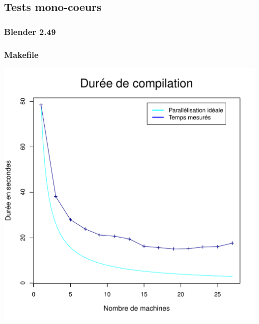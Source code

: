 \documentclass[a4paper, 11pt, titlepage]{article}
\begin{document}
\subsection {Tests mono-coeurs}




\subsubsection {Blender 2.49}
\subsubsection* {Makefile}

\begin{center}
    \includegraphics[scale=0.45]{res/sujet_makefiles_blender_249_Makefile_nth1.pdf}

\end{center}
\end{document}
